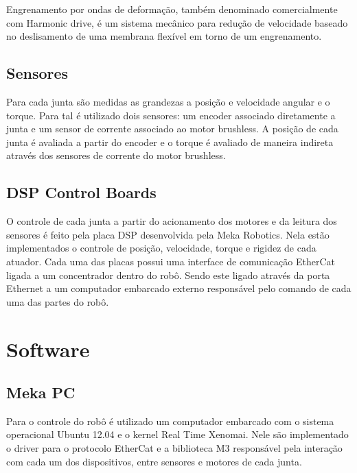 Engrenamento por ondas de deformação, também denominado comercialmente com Harmonic drive, é um sistema mecânico para redução de velocidade baseado no deslisamento de uma membrana flexível em torno de um engrenamento.




\subsection{Sensores}

Para cada junta são medidas as grandezas a posição e velocidade angular e o torque. Para tal é utilizado dois sensores: um encoder associado diretamente a junta e um sensor de corrente associado ao motor brushless. A posição de cada junta é avaliada a partir do encoder e o torque é avaliado de maneira indireta através dos sensores de corrente do motor brushless.

\subsection{DSP Control Boards}

O controle de cada junta a partir do acionamento dos motores e da leitura dos sensores é feito pela placa DSP desenvolvida pela Meka Robotics. Nela estão implementados o controle de posição, velocidade, torque e rigidez de cada atuador. Cada uma das placas possui uma interface de comunicação EtherCat ligada a um concentrador dentro do robô. Sendo este ligado através da porta Ethernet a um computador embarcado externo responsável pelo comando de cada uma das partes do robô.

\section{Software}



\subsection{Meka PC}

Para o controle do robô é utilizado um computador embarcado com o sistema operacional Ubuntu 12.04 e o kernel Real Time Xenomai. Nele são implementado o driver para o protocolo EtherCat e a biblioteca M3 responsável pela interação com cada um dos dispositivos, entre sensores e motores de cada junta.

